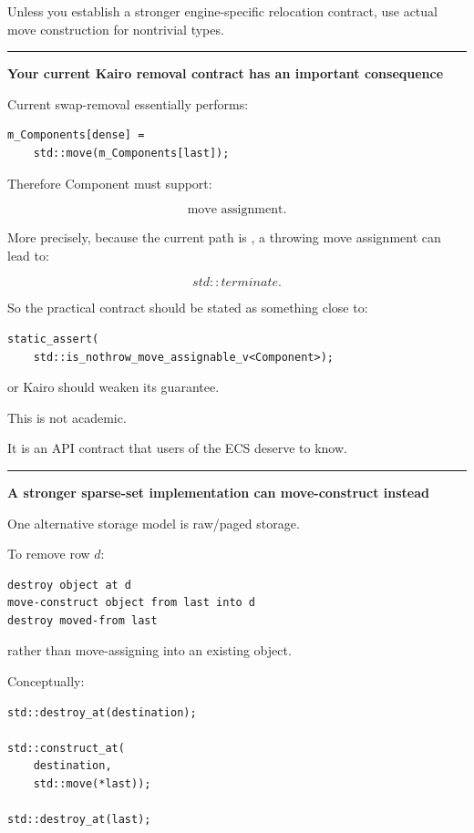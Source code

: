 Unless you establish a stronger engine-specific relocation contract, use actual move construction for nontrivial types.

\begin{center}\rule{0.5\linewidth}{0.5pt}\end{center}

\textbf{Your current Kairo removal contract has an important consequence}

Current swap-removal essentially performs:

\begin{verbatim}
m_Components[dense] =
    std::move(m_Components[last]);
\end{verbatim}

Therefore Component must support:

\[
\text{move assignment}.
\]

More precisely, because the current  path is , a throwing move assignment can lead to:

\[
std::terminate.
\]

So the practical contract should be stated as something close to:

\begin{verbatim}
static_assert(
    std::is_nothrow_move_assignable_v<Component>);
\end{verbatim}

or Kairo should weaken its  guarantee.

This is not academic.

It is an API contract that users of the ECS deserve to know.

\begin{center}\rule{0.5\linewidth}{0.5pt}\end{center}

\textbf{A stronger sparse-set implementation can move-construct instead}

One alternative storage model is raw/paged storage.

To remove row \(d\):

\begin{verbatim}
destroy object at d
move-construct object from last into d
destroy moved-from last
\end{verbatim}

rather than move-assigning into an existing object.

Conceptually:

\begin{verbatim}
std::destroy_at(destination);

std::construct_at(
    destination,
    std::move(*last));

std::destroy_at(last);
\end{verbatim}

